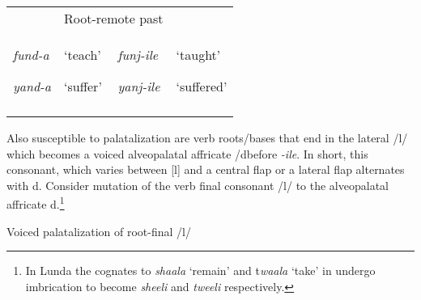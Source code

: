 \documentclass[output=paper]{langsci/langscibook}
\begin{document}
\begin{tabular}{llll}
\lsptoprule
\multicolumn{2}{l}{\mdseries Root-FV} & \multicolumn{2}{l}{\mdseries Root-remote past}\\
{\mdseries \emph{fund-a }}

\mdseries \emph{yand-a} & {\mdseries ‘teach’}

\mdseries ‘suffer’ & {\mdseries \emph{funj-ile }}

\mdseries \emph{yanj-ile} & {\mdseries ‘taught’}

\mdseries ‘suffered’\\
\lspbottomrule
\end{tabular}
Also susceptible to palatalization are verb roots/bases that end in the lateral /l/ which becomes a voiced alveopalatal affricate /dbefore \textit{{}-ile}. In short, this consonant, which varies between [l] and a central flap \textstyleipa{[ɾ]} or a lateral flap \textstyleipa{[ɺ], }alternates with \textstyleipa{/}d. Consider mutation of the verb final consonant /l/ to the alveopalatal affricate \textstyleipa{/}d.\footnote{ In Lunda the cognates to \textit{shaala} ‘remain’ and t\textit{waala }‘take’ in  undergo imbrication to become \textit{sheeli} and \textit{tweeli} respectively.}

\begin{table}
\caption{Voiced palatalization of root-final /l/}
\label{tab:12}
\end{table}
\end{document}
